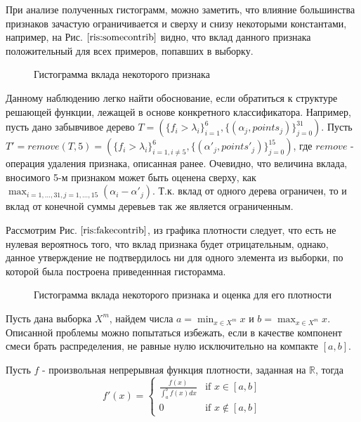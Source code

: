 \documentclass[12pt,a4paper]{report}
\begin{document}
При анализе полученных гистограмм, можно заметить, что влияние большинства признаков зачастую ограничивается и сверху и снизу некоторыми константами, например, на Рис. $\ref{ris:somecontrib}$ видно, что вклад данного признака положительный для всех примеров, попавших в выборку.

\begin{figure}[H]
\caption{Гистограмма вклада некоторого признака}
\label{ris:somecontrib}
\end{figure}

Данному наблюдению легко найти обоснование, если обратиться к структуре решающей функции, лежащей в основе конкретного классификатора.
Например, пусть дано забывчивое дерево $T = (\{f_i > \lambda_i\}_{i=1}^6, \{(\alpha_j, points_j)\}_{j=0}^{31})$. Пусть $T' = remove(T, 5) =  (\{f_i > \lambda_i\}_{i=1, i \ne 5}^6, \{(\alpha'_j, points'_j)\}_{j=0}^{15})$, где $remove$ - операция удаления признака, описанная ранее. Очевидно, что величина вклада, вносимого 5-м признаком может быть оценена сверху, как $\max_{i = 1, \dots, 31, j = 1, \dots, 15}(\alpha_i - \alpha'_j)$. Т.к. вклад от одного дерева ограничен, то и вклад от конечной суммы деревьев так же является ограниченным.

Рассмотрим Рис. $\ref{ris:fakecontrib}$, из графика плотности следует, что есть не нулевая вероятнось того, что вклад признака будет отрицательным, однако, данное утверждение не подтвердилось ни для одного элемента из выборки, по которой была построена приведеннная гисторамма.
\begin{figure}[H]
\begin{minipage}[h]{0.49\linewidth}
\end{minipage}
\hfill
\begin{minipage}[h]{0.49\linewidth}
\end{minipage}
\caption{Гистограмма вклада некоторого признака и оценка для его плотности}
\label{ris:fakecontrib}
\end{figure}

Пусть дана выборка $X^m$, найдем числа $a = \min_{x \in X^m}x$ и $b = \max_{x \in X^m}x$. Описанной проблемы можно попытаться избежать, если в качестве компонент смеси брать распределения, не равные нулю исключительно на компакте $[a, b]$. 

Пусть $f$ - произвольная непрерывная функция плотности, заданная на $\mathbb{R}$, тогда 
\begin{equation*}
f'(x) = 
 \begin{cases}
   \frac{f(x)}{\int_{a}^{b}f(x)dx} &\text{if $x \in [a, b]$}\\
   0 &\text{if $x \notin [a, b]$}
 \end{cases}
\end{equation*}
\end{document}
